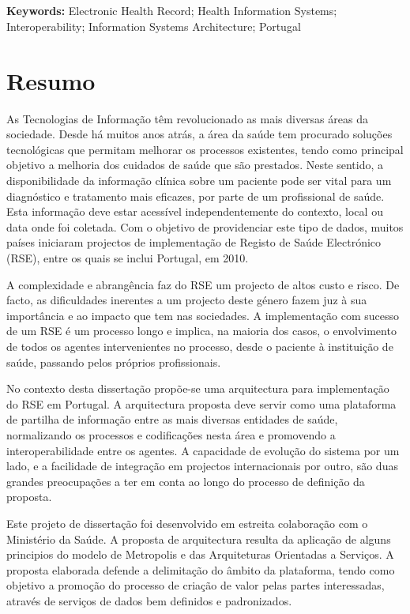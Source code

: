\section*{}
\textbf{Keywords:} Electronic Health Record; Health Information Systems; Interoperability; Information Systems Architecture; Portugal

\chapter*{Resumo}

As Tecnologias de Informação têm revolucionado as mais diversas áreas da sociedade. Desde há muitos anos atrás, a área da saúde tem procurado soluções tecnológicas que permitam melhorar os processos existentes, tendo como principal objetivo a melhoria dos cuidados de saúde que são prestados. Neste sentido, a disponibilidade da informação clínica sobre um paciente pode ser vital para um diagnóstico e tratamento mais eficazes, por parte de um profissional de saúde. Esta informação deve estar acessível independentemente do contexto, local ou data onde foi coletada. Com o objetivo de providenciar este tipo de dados, muitos países iniciaram projectos de implementação de Registo de Saúde Electrónico (RSE), entre os quais se inclui Portugal, em 2010. 

A complexidade e abrangência faz do RSE um projecto de altos custo e risco. De facto, as dificuldades inerentes a um projecto deste género fazem juz à sua importância e ao impacto que tem nas sociedades. A implementação com sucesso de um RSE é um processo longo e implica, na maioria dos casos, o envolvimento de todos os agentes intervenientes no processo, desde o paciente à instituição de saúde, passando pelos próprios profissionais.

No contexto desta dissertação propõe-se uma arquitectura para implementação do RSE em Portugal. A arquitectura proposta deve servir como uma plataforma de partilha de informação entre as mais diversas entidades de saúde, nor\-ma\-li\-zan\-do os processos e codificações nesta área e promovendo a interoperabilidade entre os agentes. A capacidade de evolução do sistema por um lado, e a facilidade de integração em projectos internacionais por outro, são duas grandes preocupações a ter em conta ao longo do processo de definição da proposta.

Este projeto de dissertação foi desenvolvido em estreita colaboração com o Ministério da Saúde. A proposta de arquitectura resulta da aplicação de alguns principios do modelo de Metropolis e das Arquiteturas Orientadas a Serviços. A proposta elaborada defende a delimitação do âmbito da plataforma, tendo como objetivo a promoção do processo de criação de valor pelas partes interessadas, através de serviços de dados bem definidos e padronizados.


